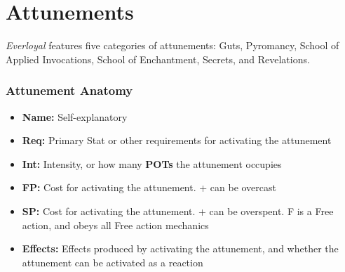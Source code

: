 \section{Attunements}
\emph{Everloyal} features five categories of attunements: Guts, Pyromancy, School of Applied Invocations, School of Enchantment, Secrets, and Revelations.

\subsubsection*{Attunement Anatomy}
\begin{itemize}
\item \textbf{Name:} Self-explanatory
\item \textbf{Req:} Primary Stat or other requirements for activating the attunement
\item \textbf{Int:} Intensity, or how many \textbf{POTs} the attunement occupies 
\item \textbf{FP:} Cost for activating the attunement. + can be overcast
\item \textbf{SP:} Cost for activating the attunement. + can be overspent. F is a Free action, and obeys all Free action mechanics
\item \textbf{Effects:} Effects produced by activating the attunement, and whether the attunement can be activated as a reaction
\end{itemize}



\pagebreak



\pagebreak



\pagebreak



\pagebreak



\pagebreak

